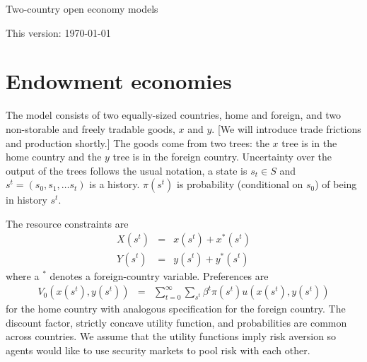 \documentclass[11pt,pdftex,twoside,letterpaper]{exam}
\begin{document}
\centerline{\Large Two-country open economy models}%
\smallskip
\centerline{This version: \today}

\section{Endowment economies}
The model consists of two equally-sized countries, home and foreign, and two non-storable and freely tradable goods, $x$ and $y$. [We will introduce trade frictions and production shortly.] The goods come from two trees: the $x$ tree is in the home country and the $y$ tree is in the foreign country. Uncertainty over the output of the trees follows the usual notation, a state is $s_t\in S$ and $s^t=(s_0,s_1,\ldots s_t)$ is a history. $\pi(s^t)$ is probability (conditional on $s_0$) of being in  history $s^t$.

The resource constraints are
\begin{eqnarray}
  X(s^t) &=& x(s^t)+x^*(s^t) \label{eq:bcx}\\
  Y(s^t) &=& y(s^t)+y^*(s^t) \label{eq:bcy}
\end{eqnarray}
where a $^*$ denotes a foreign-country variable. Preferences are
\begin{eqnarray}
  V_0\left(x\left(s^t\right), y\left(s^t\right)\right) &=&  \sum_{t=0}^\infty \sum_{s^t} \beta^t \pi(s^t)u\left( x\left(s^t\right), y\left(s^t\right) \right)
\end{eqnarray}
for the home country with analogous specification for the foreign country. The discount factor, strictly concave utility function, and probabilities are common across countries. We assume that the utility functions imply risk aversion so agents would like to use security markets to pool risk with each other.
\end{document}
